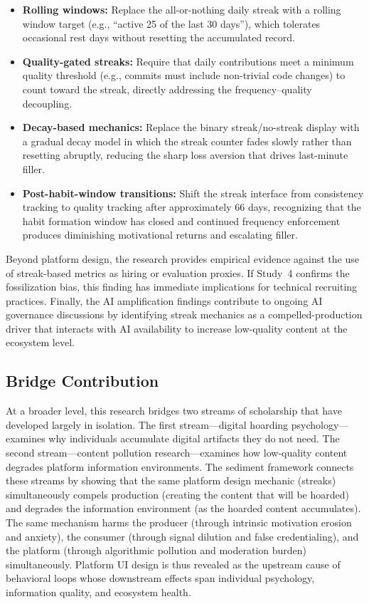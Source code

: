 \documentclass[12pt]{article}
\begin{document}
\begin{itemize}
    \item \textbf{Rolling windows:} Replace the all-or-nothing daily streak with a rolling window target (e.g., ``active 25 of the last 30 days''), which tolerates occasional rest days without resetting the accumulated record.
    \item \textbf{Quality-gated streaks:} Require that daily contributions meet a minimum quality threshold (e.g., commits must include non-trivial code changes) to count toward the streak, directly addressing the frequency--quality decoupling.
    \item \textbf{Decay-based mechanics:} Replace the binary streak/no-streak display with a gradual decay model in which the streak counter fades slowly rather than resetting abruptly, reducing the sharp loss aversion that drives last-minute filler.
    \item \textbf{Post-habit-window transitions:} Shift the streak interface from consistency tracking to quality tracking after approximately 66 days, recognizing that the habit formation window has closed and continued frequency enforcement produces diminishing motivational returns and escalating filler.
\end{itemize}

Beyond platform design, the research provides empirical evidence against the use of streak-based metrics as hiring or evaluation proxies. If Study~4 confirms the fossilization bias, this finding has immediate implications for technical recruiting practices. Finally, the AI amplification findings contribute to ongoing AI governance discussions by identifying streak mechanics as a compelled-production driver that interacts with AI availability to increase low-quality content at the ecosystem level.

\subsection{Bridge Contribution}
\label{sec:contributions-bridge}

At a broader level, this research bridges two streams of scholarship that have developed largely in isolation. The first stream---digital hoarding psychology---examines why individuals accumulate digital artifacts they do not need. The second stream---content pollution research---examines how low-quality content degrades platform information environments. The sediment framework connects these streams by showing that the same platform design mechanic (streaks) simultaneously compels production (creating the content that will be hoarded) and degrades the information environment (as the hoarded content accumulates). The same mechanism harms the producer (through intrinsic motivation erosion and anxiety), the consumer (through signal dilution and false credentialing), and the platform (through algorithmic pollution and moderation burden) simultaneously. Platform UI design is thus revealed as the upstream cause of behavioral loops whose downstream effects span individual psychology, information quality, and ecosystem health.
\end{document}
